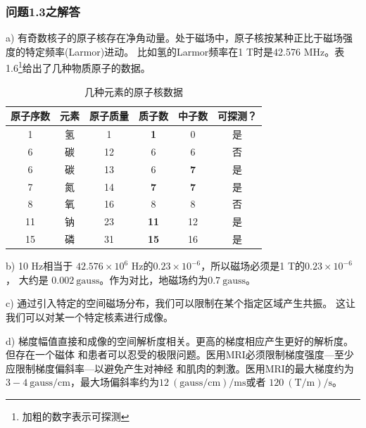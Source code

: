 \subsubsection{问题1.3之解答}
a) 有奇数核子的原子核存在净角动量。处于磁场中，原子核按某种正比于磁场强度的特定频率(Larmor)进动。
比如氢的Larmor频率在1 T时是42.576 MHz。表1.6\footnote{加粗的数字表示可探测}给出了几种物质原子的数据。
\begin{table}[htbp]\small
  \centering
  \caption{几种元素的原子核数据} \label{tb:atomic}
\begin{tabular}{|c|c|c|c|c|c|}
  \hline
原子序数&元素&原子质量&质子数&中子数&可探测？ \\ \hline \hline
1&氢&1&\textbf{1}&0&是 \\ \hline
6&碳&12&6&6&否 \\ \hline
6&碳&13&6&\textbf{7}&是 \\ \hline
7&氮&14&\textbf{7}&\textbf{7}&是 \\ \hline
8&氧&16&8&8&否 \\ \hline
11&钠&23&\textbf{11}&12&是 \\ \hline
15&磷&31&\textbf{15}&16&是 \\ \hline
\end{tabular}
\end{table}

b) 10 Hz相当于 $42.576×10^6$ Hz的$0.23×10^{−6}$，所以磁场必须是1 T的$0.23×10^{−6}$ ，
大约是 $0.002\ \mathrm{gauss}$。作为对比，地磁场约为$0.7 \ \mathrm{gauss}$。

c) 通过引入特定的空间磁场分布，我们可以限制在某个指定区域产生共振。
这让我们可以对某一个特定核素进行成像。

d) 梯度幅值直接和成像的空间解析度相关。更高的梯度相应产生更好的解析度。但存在一个磁体
和患者可以忍受的极限问题。医用MRI必须限制梯度强度---至少应限制梯度偏斜率---以避免产生对神经
和肌肉的刺激。医用MRI的最大梯度约为$3-4 \ \mathrm{gauss/cm}$，最大场偏斜率约为$12\ \mathrm{(gauss/cm)/ms}$或者
$120\ \mathrm{(T/m)/s}$。

